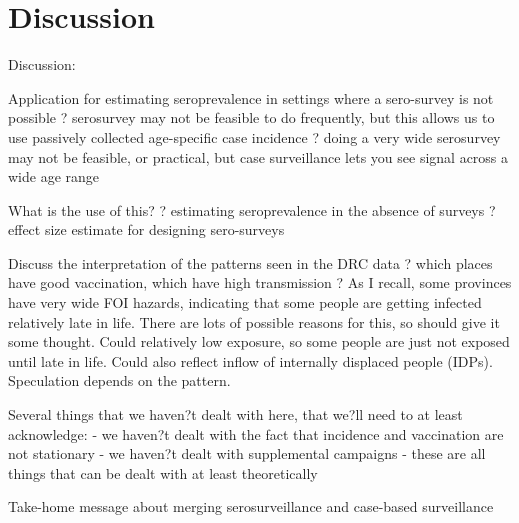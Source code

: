 \documentclass[nofootinbib,aps,pre,twocolumn,superscriptaddress,showkeys,showpacs]{revtex4-1}
\begin{document}
\section{Discussion \label{sec:Discussion}}
Discussion:

Application for estimating seroprevalence in settings where a sero-survey is not possible 
	? serosurvey may not be feasible to do frequently, but this allows us to use passively collected age-specific case incidence 
	? doing a very wide serosurvey may not be feasible, or practical, but case surveillance lets you see signal across a wide age range

What is the use of this?
	? estimating seroprevalence in the absence of surveys
	? effect size estimate for designing sero-surveys

Discuss the interpretation of the patterns seen in the DRC data 
	? which places have good vaccination, which have high transmission
	? As I recall, some provinces have very wide FOI hazards, indicating that some people are getting infected relatively late in life.  There are lots of possible reasons for this, so should give it some thought.  Could relatively low exposure, so some people are just not exposed until late in life.  Could also reflect inflow of internally displaced people (IDPs).  Speculation depends on the pattern. 

Several things that we haven?t dealt with here, that we?ll need to at least acknowledge:
	- we haven?t dealt with the fact that incidence and vaccination are not stationary
	- we haven?t dealt with supplemental campaigns
	- these are all things that can be dealt with at least theoretically

Take-home message about merging serosurveillance and case-based surveillance



\end{document}
